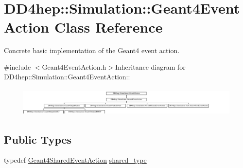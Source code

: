 \hypertarget{class_d_d4hep_1_1_simulation_1_1_geant4_event_action}{
\section{DD4hep::Simulation::Geant4EventAction Class Reference}
\label{class_d_d4hep_1_1_simulation_1_1_geant4_event_action}
}


Concrete basic implementation of the Geant4 event action.  


{\ttfamily \#include $<$Geant4EventAction.h$>$}Inheritance diagram for DD4hep::Simulation::Geant4EventAction::\begin{figure}[H]
\begin{center}
\leavevmode
\includegraphics[height=1.51864cm]{class_d_d4hep_1_1_simulation_1_1_geant4_event_action}
\end{center}
\end{figure}
\subsection*{Public Types}
\begin{DoxyCompactItemize}
\item 
typedef \hyperlink{class_d_d4hep_1_1_simulation_1_1_geant4_shared_event_action}{Geant4SharedEventAction} \hyperlink{class_d_d4hep_1_1_simulation_1_1_geant4_event_action_abef0506a1372b5723ccfb84ec11675e4}{shared\_\-type}
\end{DoxyCompactItemize}
